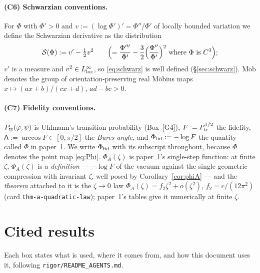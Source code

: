 \documentclass[11pt]{article}
\newcommand{\Sch}{\mathcal S}
\newcommand{\Mob}{\operatorname{M\ddot ob}}
\newcommand{\Bang}{\mathsf A}
\theoremstyle{definition}\newtheorem{example}[theorem]{Example}
\begin{document}
\paragraph{(C6) Schwarzian conventions.}
For $\Phi$ with $\Phi'>0$ and $v:=(\log\Phi')'=\Phi''/\Phi'$ of locally bounded variation we
define the Schwarzian derivative as the distribution
\begin{equation}\label{eq:schwarz}
 \Sch(\Phi):=v'-\tfrac12v^2
 \qquad\Bigl(=\frac{\Phi'''}{\Phi'}-\frac32\Bigl(\frac{\Phi''}{\Phi'}\Bigr)^2
 \text{ where $\Phi$ is $C^3$}\Bigr);
\end{equation}
$v'$ is a measure and $v^2\in L^\infty_{\rm loc}$, so \eqref{eq:schwarz} is well defined
(\S\ref{sec:schwarz}).  $\Mob$ denotes the group of orientation-preserving real M\"obius maps
$x\mapsto(ax+b)/(cx+d)$, $ad-bc>0$.

\paragraph{(C7) Fidelity conventions.}
$P_{\rm tr}(\varphi,\psi)$ is Uhlmann's transition probability (Box~[G4]),
$F:=P_{\rm tr}^{1/2}$ the fidelity, $\Bang:=\arccos F\in[0,\pi/2]$ the \emph{Bures angle}, and
$\Phi_{\rm fid}:=-\log F$ the quantity called $\Phi$ in paper~1.  We write $\Phi_{\rm fid}$ with
its subscript throughout, because $\Phi$ denotes the point map \eqref{eq:Phi}.  $\Phi_A(\zeta)$
is paper~1's single-step function: at finite $\zeta$, $\Phi_A(\zeta)$ is a \emph{definition}
--- $-\log F$ of the vacuum against the single geometric compression with invariant $\zeta$,
well posed by Corollary~\ref{cor:phiA} --- and the \emph{theorem} attached to it is the
$\zeta\to0$ law $\Phi_A(\zeta)=f_2\zeta^2+o(\zeta^2)$, $f_2=c/(12\pi^2)$ (card
\texttt{thm-a-quadratic-law}); paper~1's tables give it numerically at finite $\zeta$.

\section{Cited results}\label{sec:cited}

Each box states what is used, where it comes from, and how this document uses it, following
\texttt{rigor/README\_AGENTS.md}.
\end{document}

